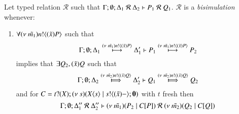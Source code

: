 \begin{definition}[Bisimulation]\rm
	Let typed relation $\mathcal{R}$ such that $\Gamma; \emptyset; \Delta_1\ \mathcal{R}\ \Delta_2 \proves P_1\ \mathcal{R}\ Q_1$.
	$\mathcal{R}$ is a {\em bisimulation} whenever:
	\begin{enumerate}
		\item	$\forall (\nu\ \tilde{m_1}) n ! \langle (\tilde{x})P \rangle$ such that
			\[
				\Gamma; \emptyset; \Delta_1 \stackrel{(\nu\ \tilde{m_1}) n ! \langle (\tilde{x})P \rangle}{\longmapsto} \Delta_1' \vdash P_1 \stackrel{(\nu\ \tilde{m_1}) n ! \langle (\tilde{x})P \rangle}{\longmapsto} P_2
			\]
			implies that $\exists Q_2, (\tilde{x})Q$ such that
			\[
				\Gamma; \emptyset; \Delta_2 \Hby{\news{\tilde{m_2}} \bactout{n}{\abs{\tilde{x}} Q}} \Delta_2' \proves Q_1 \Hby{\news{\tilde{m_2}} \bactout{n}{\abs{\tilde{x}} Q}} Q_2
			\]
			and for $C = t ? (X) ; (\nu\ s)(X\langle s \rangle \;|\; s ! \langle (\tilde{x})- \rangle ; \mathbf{0})$ with $t$ fresh
			then
			\[
				\Gamma; \emptyset; \Delta_1''\ \mathcal{R}\ \Delta_2'' \proves
				\newsp{\tilde{m_1}}{P_2 \Par \context{C}{P}}
				\ \mathcal{R}\ 
				\newsp{\tilde{m_2}}{Q_2 \Par \context{C}{Q}}
			\]



\end{enumerate}
\end{definition}
